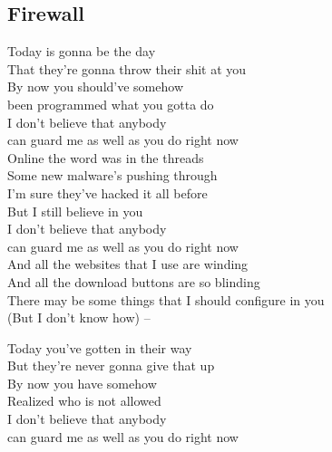 \subsection{Firewall}

 Today is gonna be the day \\
That they’re gonna throw their shit at you \\
By now you should’ve somehow  \\
been programmed what you gotta do  \\
I don’t believe that anybody \\
can guard me as well as you  do right now  \ \  \ \ \\

Online the word was in the threads \\
Some new malware’s pushing through \\
I’m sure they’ve hacked it all before \\
But I still believe in you \\
I don’t believe that anybody \\
can guard me as well as you do right now \\

And all the websites that  I use are winding \\
And all the download buttons are so blinding \\
There may be some things that I should configure in you \\
(But I don't know how) – \\


Today you’ve gotten in their way \\
But they’re never gonna give that up \\
By now you have somehow \\
Realized who is not allowed \\
I don’t believe that anybody \\
can guard me as well as you do right now \\

